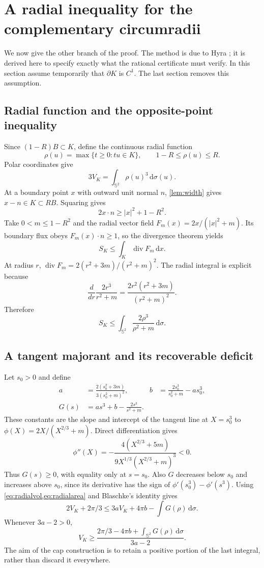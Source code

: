 \documentclass[11pt]{article}
\numberwithin{equation}{section}
\theoremstyle{definition}\newtheorem{definition}[theorem]{Definition}
\theoremstyle{remark}\newtheorem{remark}[theorem]{Remark}
\newcommand{\Sph}{\mathbb S^2}
\newcommand{\dd}{\,\mathrm d}
\begin{document}
\section{A radial inequality for the complementary circumradii}\label{sec:radial}
We now give the other branch of the proof. The method is due to Hyra
\cite{Hyra}; it is derived here to specify exactly what the rational
certificate must verify. In this section assume temporarily that $\partial K$
is $C^1$. The last section removes this assumption.

\subsection{Radial function and the opposite-point inequality}
Since $(1-R)B\subset K$, define the continuous radial function
\[
 \rho(u)=\max\{t\ge0:tu\in K\},\qquad 1-R\le\rho(u)\le R.
\]
Polar coordinates give
\begin{equation}\label{eq:radialvol}
 3V_K=\int_{\Sph}\rho(u)^3\dd\sigma(u).
\end{equation}
At a boundary point $x$ with outward unit normal $n$, \cref{lem:width}
gives $x-n\in K\subset RB$. Squaring gives
\begin{equation}\label{eq:radialnormal}
 2x\cdot n\ge |x|^2+1-R^2.
\end{equation}
Take $0<m\le1-R^2$ and the radial vector field
$F_m(x)=2x/(|x|^2+m)$. Its boundary flux obeys $F_m(x)\cdot n\ge1$,
so the divergence theorem yields
\[
 S_K\le\int_K\operatorname{div}F_m\dd x.
\]
At radius $r$, $\operatorname{div}F_m=2(r^2+3m)/(r^2+m)^2$. The radial
integral is explicit because
\[
 \frac{d}{dr}\frac{2r^3}{r^2+m}
   =\frac{2r^2(r^2+3m)}{(r^2+m)^2}.
\]
Therefore
\begin{equation}\label{eq:radialarea}
 S_K\le\int_{\Sph}\frac{2\rho^3}{\rho^2+m}\dd\sigma.
\end{equation}

\subsection{A tangent majorant and its recoverable deficit}
Let $s_0>0$ and define
\begin{align}
 a&=\frac{2(s_0^2+3m)}{3(s_0^2+m)^2},&
 b&=\frac{2s_0^3}{s_0^2+m}-as_0^3,\nonumber\\
 G(s)&=as^3+b-\frac{2s^3}{s^2+m}.\label{eq:tangent}
\end{align}
These constants are the slope and intercept of the tangent line at
$X=s_0^3$ to $\phi(X)=2X/(X^{2/3}+m)$. Direct differentiation gives
\[
 \phi''(X)=-\frac{4(X^{2/3}+5m)}{9X^{1/3}(X^{2/3}+m)^3}<0.
\]
Thus $G(s)\ge0$, with equality only at $s=s_0$. Also $G$ decreases below
$s_0$ and increases above $s_0$, since its derivative has the sign of
$\phi'(s_0^3)-\phi'(s^3)$.
Using \cref{eq:radialvol,eq:radialarea} and Blaschke's identity gives
\[
 2V_K+2\pi/3\le3aV_K+4\pi b-\int G(\rho)\dd\sigma.
\]
Whenever $3a-2>0$,
\begin{equation}\label{eq:master}
 \boxed{V_K\ge
 \frac{2\pi/3-4\pi b+\int_{\Sph}G(\rho)\dd\sigma}{3a-2}.}
\end{equation}
The aim of the cap construction is to retain a positive portion of the last
integral, rather than discard it everywhere.
\end{document}
